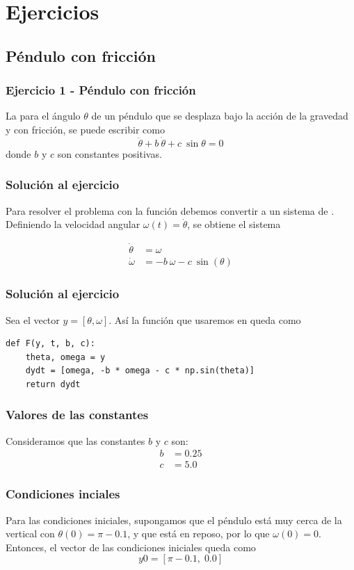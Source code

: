 \section{Ejercicios}
\subsection{Péndulo con fricción}
\begin{frame}
\frametitle{Ejercicio 1 - Péndulo con fricción}
La  para el ángulo $\theta$ de un péndulo que se desplaza bajo la acción de la gravedad y con fricción, se puede escribir como
\[ \ddot{\theta} +  b \: \dot{\theta} +  c \: \sin \theta = 0 \]
donde $b$ y $c$ son constantes positivas.
\end{frame}
\begin{frame}
\frametitle{Solución al ejercicio}
Para resolver el problema con la función  debemos convertir a un sistema de .
\\
\bigskip
Definiendo la velocidad angular $\omega (t) = \dot{\theta}$, se obtiene el sistema
\begin{center}
\begin{align*}
\dot{\theta} &= \omega \\
\dot{\omega} &= -b \:\omega - c \: \sin(\theta)
\end{align*}
\end{center}
\end{frame}
\begin{frame}[fragile]
\frametitle{Solución al ejercicio}
Sea el vector $y =  [\theta, \omega]$. Así la función que usaremos en \python{} queda como
\begin{lstlisting}[caption=Función a integrar, style=FormattedNumber, basicstyle=\linespread{1.1}\ttfamily=\small, columns=fullflexible]
def F(y, t, b, c):
    theta, omega = y
    dydt = [omega, -b * omega - c * np.sin(theta)]
    return dydt
\end{lstlisting}
\end{frame}
\begin{frame}
\frametitle{Valores de las constantes}
Consideramos que las constantes $b$ y $c$ son:
\begin{align*}
b &= 0.25 \\
c &= 5.0
\end{align*} 
\end{frame}
\begin{frame}
\frametitle{Condiciones inciales}
Para las condiciones iniciales, supongamos que el péndulo está muy cerca de la vertical con $\theta(0) = \pi - 0.1$, y que está en reposo, por lo que $\omega(0) = 0$.
\\
\bigskip
Entonces, el vector de las condiciones iniciales queda como
\[ y0 =  [\pi - 0.1 , \; 0.0] \]
\end{frame}
